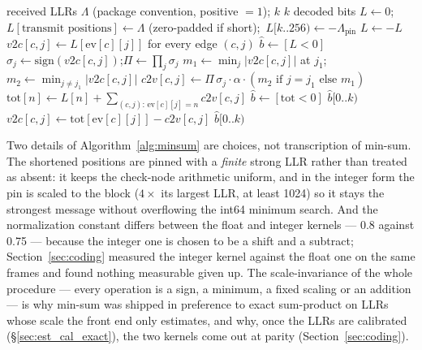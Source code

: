 \begin{algorithm}[H]
\caption{Normalized min-sum: float ($\alpha = 0.8$) and integer ($x - (x \gg 2)$).}
\label{alg:minsum}
\begin{algorithmic}[1]
\Require received LLRs $\Lambda$ (package convention, positive $= 1$); $k$
\Ensure $k$ decoded bits
\State $L \gets 0$;\ $L[\text{transmit positions}] \gets \Lambda$ (zero-padded if short);\ $L[k..256) \gets -\Lambda_{\mathrm{pin}}$ 
\State $L \gets -L$ 
\State $v2c[c, j] \gets L[\mathrm{ev}[c][j]]$ for every edge $(c, j)$ 
\State $\hat b \gets [L < 0]$
     
        \State $\sigma_j \gets \mathrm{sign}(v2c[c, j])$;\quad $\Pi \gets \prod_j \sigma_j$ 
        \State $m_1 \gets \min_j |v2c[c, j]|$ at $j_1$;\quad $m_2 \gets \min_{j \ne j_1} |v2c[c, j]|$
        \State $c2v[c, j] \gets \Pi\, \sigma_j \cdot \alpha \cdot (m_2 \text{ if } j = j_1 \text{ else } m_1)$ 
    \EndFor
    \State $\mathrm{tot}[n] \gets L[n] + \sum_{(c, j):\, \mathrm{ev}[c][j] = n} c2v[c, j]$ 
    \State $\hat b \gets [\mathrm{tot} < 0]$
     \Return $\hat b[0..k)$  \EndIf
    \State $v2c[c, j] \gets \mathrm{tot}[\mathrm{ev}[c][j]] - c2v[c, j]$ 
\EndFor
\State \Return $\hat b[0..k)$ 
\end{algorithmic}
\end{algorithm}

Two details of Algorithm~\ref{alg:minsum} are choices, not
transcription of min-sum.  The shortened positions are pinned with a
\emph{finite} strong LLR rather than treated as absent: it keeps the
check-node arithmetic uniform, and in the integer form the pin is
scaled to the block ($4 \times$ its largest LLR, at least 1024) so it
stays the strongest message without overflowing the int64 minimum
search.  And the normalization constant differs between the float and
integer kernels --- 0.8 against 0.75 --- because the integer one is
chosen to be a shift and a subtract; Section~\ref{sec:coding} measured
the integer kernel against the float one on the same frames and found
nothing measurable given up.  The
scale-invariance of the whole procedure --- every operation is a sign,
a minimum, a fixed scaling or an addition --- is why min-sum was
shipped in preference to exact sum-product on LLRs whose scale the
front end only estimates, and why, once the LLRs are calibrated
(\S\ref{sec:est_cal_exact}), the two kernels come out at parity
(Section~\ref{sec:coding}).
